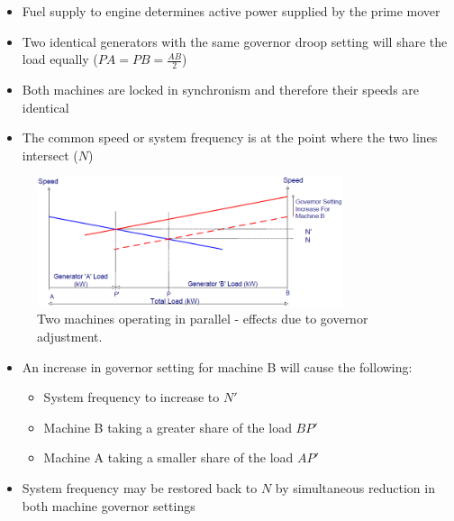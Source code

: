 \begin{itemize}
    \item Fuel supply to engine determines active power supplied by the prime mover
    \item Two identical generators with the same governor droop setting will share the load equally ($PA = PB = \frac{AB}{2}$)
    \item Both machines are locked in synchronism and therefore their speeds are identical
    \item The common speed or system frequency is at the point where the two lines intersect ($N$)
\end{itemize}
\begin{figure}[H]
    \centering
    \includegraphics[width = 0.8\textwidth]{img/figure83.png}
    \caption{Two machines operating in parallel - effects due to governor adjustment.}
\end{figure}
\begin{itemize}
    \item An increase in governor setting for machine B will cause the following:
          \begin{itemize}
              \item System frequency to increase to $N'$
              \item Machine B taking a greater share of the load $BP'$
              \item Machine A taking a smaller share of the load $AP'$
          \end{itemize}
    \item System frequency may be restored back to $N$ by simultaneous reduction in both machine governor settings
\end{itemize}
